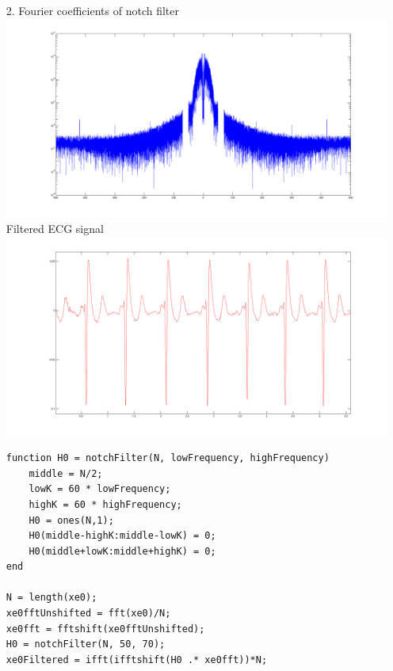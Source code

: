 \documentclass{article}
\begin{document}
\begin{enumerate}
\newpage

\item[2.]
	Fourier coefficients of notch filter\\
	\includegraphics[scale=0.25]{../images/P2_FilteredFourierCoefficients} \\
	
	Filtered ECG signal\\
	\includegraphics[scale=0.25]{../images/P2_FilteredECG} \\

\begin{lstlisting}
function H0 = notchFilter(N, lowFrequency, highFrequency)
    middle = N/2;
    lowK = 60 * lowFrequency;
    highK = 60 * highFrequency;
    H0 = ones(N,1);
    H0(middle-highK:middle-lowK) = 0;
    H0(middle+lowK:middle+highK) = 0;
end

N = length(xe0);
xe0fftUnshifted = fft(xe0)/N;
xe0fft = fftshift(xe0fftUnshifted);
H0 = notchFilter(N, 50, 70);
xe0Filtered = ifft(ifftshift(H0 .* xe0fft))*N;
\end{lstlisting}

\end{enumerate}
\end{document}
